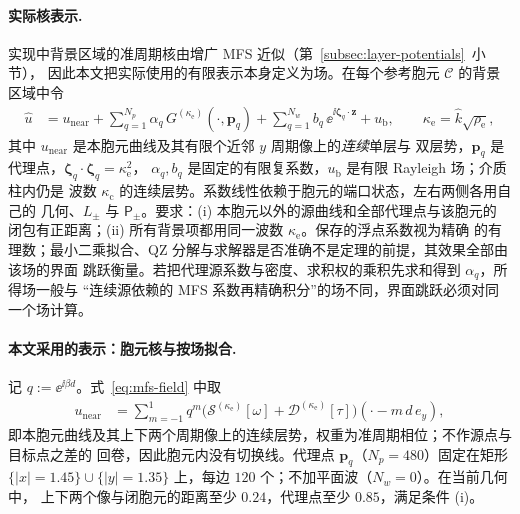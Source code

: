 \paragraph{实际核表示.}
实现中背景区域的准周期核由增广 MFS 近似（第~\ref{subsec:layer-potentials}~小节），
因此本文把实际使用的有限表示本身定义为场。在每个参考胞元 $\mathcal C$ 的背景区域中令
\begin{align}
  \widehat u
  &=u_{\mathrm{near}}
    +\sum_{q=1}^{N_p}\alpha_q\,G^{(\kappa_{\mathrm e})}(\cdot,\mathbf p_q)
    +\sum_{q=1}^{N_w}b_q\,\ee^{\ii\boldsymbol\zeta_q\cdot\mathbf z}
    +u_{\mathrm b},
  \qquad\kappa_{\mathrm e}=\widehat k\sqrt{\rho_{\mathrm e}},
  \label{eq:mfs-field}
\end{align}
其中 $u_{\mathrm{near}}$ 是本胞元曲线及其有限个近邻 $y$ 周期像上的\emph{连续}单层与
双层势，$\mathbf p_q$ 是代理点，$\boldsymbol\zeta_q\cdot\boldsymbol\zeta_q=\kappa_{\mathrm e}^2$，
$\alpha_q,b_q$ 是固定的有限复系数，$u_{\mathrm b}$ 是有限 Rayleigh 场；介质柱内仍是
波数 $\kappa_{\mathrm c}$ 的连续层势。系数线性依赖于胞元的端口状态，左右两侧各用自己的
几何、$L_\pm$ 与 $\mathsf P_\pm$。要求：(i) 本胞元以外的源曲线和全部代理点与该胞元的
闭包有正距离；(ii) 所有背景项都用同一波数 $\kappa_{\mathrm e}$。保存的浮点系数视为精确
的有理数；最小二乘拟合、QZ 分解与求解器是否准确不是定理的前提，其效果全部由该场的界面
跳跃衡量。若把代理源系数与密度、求积权的乘积先求和得到 $\alpha_q$，所得场一般与
“连续源依赖的 MFS 系数再精确积分”的场不同，界面跳跃必须对同一个场计算。

\paragraph{本文采用的表示：胞元核与按场拟合.}
记 $q:=\ee^{\ii\beta d}$。式~\eqref{eq:mfs-field} 中取
\begin{align}
  u_{\mathrm{near}}
  &=\sum_{m=-1}^{1}q^m\bigl(\mathcal S^{(\kappa_{\mathrm e})}[\omega]
    +\mathcal D^{(\kappa_{\mathrm e})}[\tau]\bigr)(\cdot-m\,d\,e_y),
  \label{eq:cell-kernel-near}
\end{align}
即本胞元曲线及其上下两个周期像上的连续层势，权重为准周期相位；不作源点与目标点之差的
回卷，因此胞元内没有切换线。代理点 $\mathbf p_q$（$N_p=480$）固定在矩形
$\{|x|=1.45\}\cup\{|y|=1.35\}$ 上，每边 $120$ 个；不加平面波（$N_w=0$）。在当前几何中，
上下两个像与闭胞元的距离至少 $0.24$，代理点至少 $0.85$，满足条件 (i)。

